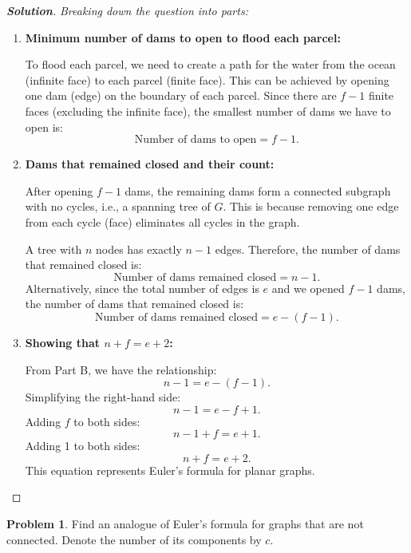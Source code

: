 \documentclass[12pt]{article}
\theoremstyle{definition}
\newtheorem{p}{Problem}
\newenvironment{solution}
  {\begin{mdframed}[linewidth=0.5pt, roundcorner=10pt, linecolor=black]\begin{proof}[\bfseries Solution]}
  {\qedhere\end{proof}\end{mdframed}}
\begin{document}
  \begin{solution} \emph{Breaking down the question into parts:}\\
  \begin{enumerate}
      \item \textbf{Minimum number of dams to open to flood each parcel:}
  
      To flood each parcel, we need to create a path for the water from the ocean (infinite face) to each parcel (finite face). This can be achieved by opening one dam (edge) on the boundary of each parcel. Since there are \( f - 1 \) finite faces (excluding the infinite face), the smallest number of dams we have to open is:
      \[
      \text{Number of dams to open} = f - 1.
      \]
  
      \item \textbf{Dams that remained closed and their count:}
  
      After opening \( f - 1 \) dams, the remaining dams form a connected subgraph with no cycles, i.e., a spanning tree of \( G \). This is because removing one edge from each cycle (face) eliminates all cycles in the graph.
  
      A tree with \( n \) nodes has exactly \( n - 1 \) edges. Therefore, the number of dams that remained closed is:
      \[
      \text{Number of dams remained closed} = n - 1.
      \]
      Alternatively, since the total number of edges is \( e \) and we opened \( f - 1 \) dams, the number of dams that remained closed is:
      \[
      \text{Number of dams remained closed} = e - (f - 1).
      \]
  
      \item \textbf{Showing that \( n + f = e + 2 \):}
  
      From Part B, we have the relationship:
      \[
      n - 1 = e - (f - 1).
      \]
      Simplifying the right-hand side:
      \[
      n - 1 = e - f + 1.
      \]
      Adding \( f \) to both sides:
      \[
      n - 1 + f = e + 1.
      \]
      Adding 1 to both sides:
      \[
      n + f = e + 2.
      \]
      This equation represents Euler's formula for planar graphs.
  \end{enumerate}
  \end{solution}
  
  

\vspace{0.9cm}
\begin{p} 
  Find an analogue of Euler's formula for graphs that are not connected. Denote the number of its components by \( c \).
  \end{p}
  
\end{document}
